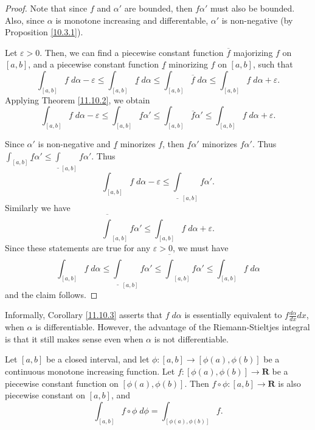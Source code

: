 \begin{proof}
    Note that since \(f\) and \(\alpha'\) are bounded, then \(f \alpha'\) must also be bounded.
    Also, since \(\alpha\) is monotone increasing and differentable, \(\alpha'\) is non-negative (by Proposition \ref{10.3.1}).

    Let \(\varepsilon > 0\).
    Then, we can find a piecewise constant function \(\overline{f}\) majorizing \(f\) on \([a, b]\), and a piecewise constant function \(\underline{f}\) minorizing \(f\) on \([a, b]\), such that
    \[
        \int_{[a, b]} f \; d \alpha - \varepsilon \leq \int_{[a, b]} \underline{f} \; d \alpha \leq \int_{[a, b]} \overline{f} \; d \alpha \leq \int_{[a, b]} f \; d \alpha + \varepsilon.
    \]
    Applying Theorem \ref{11.10.2}, we obtain
    \[
        \int_{[a, b]} f \; d \alpha - \varepsilon \leq \int_{[a, b]} \underline{f} \alpha' \leq \int_{[a, b]} \overline{f} \alpha' \leq \int_{[a, b]} f \; d \alpha + \varepsilon.
    \]

    Since \(\alpha'\) is non-negative and \(\underline{f}\) minorizes \(f\), then \(\underline{f} \alpha'\) minorizes \(f \alpha'\).
    Thus \(\int_{[a, b]} \underline{f} \alpha' \leq \underline{\int}_{[a, b]} f \alpha'\).
    Thus
    \[
        \int_{[a, b]} f \; d \alpha - \varepsilon \leq \underline{\int}_{[a, b]} f \alpha'.
    \]
    Similarly we have
    \[
        \overline{\int}_{[a, b]} f \alpha' \leq \int_{[a, b]} f \; d \alpha + \varepsilon.
    \]
    Since these statements are true for any \(\varepsilon > 0\), we must have
    \[
        \int_{[a, b]} f \; d \alpha \leq \underline{\int}_{[a, b]} f \alpha' \leq \overline{\int}_{[a, b]} f \alpha' \leq \int_{[a, b]} f \; d \alpha
    \]
    and the claim follows.
\end{proof}

\begin{remark}\label{11.10.4}
    Informally, Corollary \ref{11.10.3} asserts that \(f \; d \alpha\) is essentially equivalent to \(f \frac{d \alpha}{dx} dx\), when \(\alpha\) is differentiable.
    However, the advantage of the Riemann-Stieltjes integral is that it still makes sense even when \(\alpha\) is not differentiable.
\end{remark}

\begin{lemma}\label{11.10.5}
    Let \([a, b]\) be a closed interval, and let \(\phi : [a, b] \to [\phi(a), \phi(b)]\) be a continuous monotone increasing function.
    Let \(f : [\phi(a), \phi(b)] \to \mathbf{R}\) be a piecewise constant function on \([\phi(a), \phi(b)]\).
    Then \(f \circ \phi : [a, b] \to \mathbf{R}\) is also piecewise constant on \([a, b]\), and
    \[
        \int_{[a, b]} f \circ \phi \; d \phi = \int_{[\phi(a), \phi(b)]} f.
    \]
\end{lemma}

